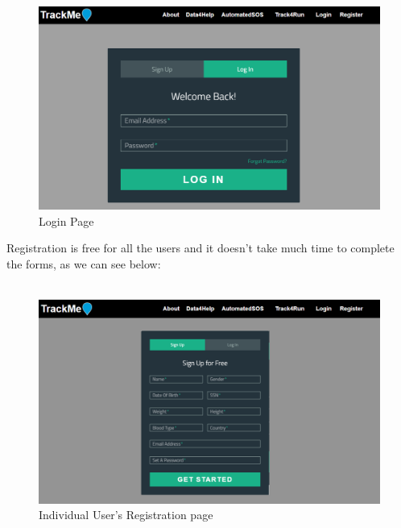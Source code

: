 \documentclass[12pt]{article}
\begin{document}
\begin{figure}[H]
\centering
\includegraphics[scale=0.5]{../Assets/Login.png}
\caption[UI: Login Page]{Login Page}
\label{fig:Login}
\end{figure}

Registration is free for all the users and it doesn't take much time to complete the forms, as we can see below:\\\\

\begin{figure}[H]
\centering
\includegraphics[scale=0.5]{../Assets/Register.png}
\caption[UI: Individual User's Registration page]{Individual User's Registration page}
\label{fig:Register}
\end{figure}
\end{document}
